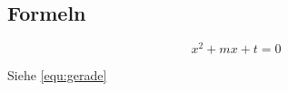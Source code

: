 \subsection{Formeln}\label{subsec:formulas}

\begin{equation}\label{equ:gerade}
	x^2 + mx + t = 0
\end{equation}

Siehe \autoref{equ:gerade}
